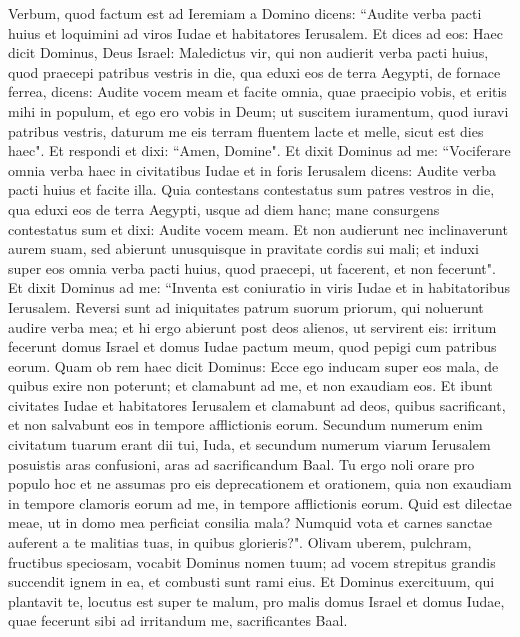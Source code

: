 \begin{biblechapter}  
\verse Verbum, quod factum est ad Ieremiam a Domino dicens: 
\verse “Audite verba pacti huius et loquimini ad viros Iudae et habitatores Ierusalem. 
\verse Et dices ad eos: Haec dicit Dominus, Deus Israel: Maledictus vir, qui non audierit verba pacti huius, 
\verse quod praecepi patribus vestris in die, qua eduxi eos de terra Aegypti, de fornace ferrea, dicens: Audite vocem meam et facite omnia, quae praecipio vobis, et eritis mihi in populum, et ego ero vobis in Deum; 
\verse ut suscitem iuramentum, quod iuravi patribus vestris, daturum me eis terram fluentem lacte et melle, sicut est dies haec". Et respondi et dixi: “Amen, Domine". 
\verse Et dixit Dominus ad me: “Vociferare omnia verba haec in civitatibus Iudae et in foris Ierusalem dicens: Audite verba pacti huius et facite illa. 
\verse Quia contestans contestatus sum patres vestros in die, qua eduxi eos de terra Aegypti, usque ad diem hanc; mane consurgens contestatus sum et dixi: Audite vocem meam. 
\verse Et non audierunt nec inclinaverunt aurem suam, sed abierunt unusquisque in pravitate cordis sui mali; et induxi super eos omnia verba pacti huius, quod praecepi, ut facerent, et non fecerunt". 
\verse Et dixit Dominus ad me: “Inventa est coniuratio in viris Iudae et in habitatoribus Ierusalem. 
\verse Reversi sunt ad iniquitates patrum suorum priorum, qui noluerunt audire verba mea; et hi ergo abierunt post deos alienos, ut servirent eis: irritum fecerunt domus Israel et domus Iudae pactum meum, quod pepigi cum patribus eorum. 
\verse Quam ob rem haec dicit Dominus: Ecce ego inducam super eos mala, de quibus exire non poterunt; et clamabunt ad me, et non exaudiam eos. 
\verse Et ibunt civitates Iudae et habitatores Ierusalem et clamabunt ad deos, quibus sacrificant, et non salvabunt eos in tempore afflictionis eorum. 
\verse Secundum numerum enim civitatum tuarum erant dii tui, Iuda, et secundum numerum viarum Ierusalem posuistis aras confusioni, aras ad sacrificandum Baal. 
\verse Tu ergo noli orare pro populo hoc et ne assumas pro eis deprecationem et orationem, quia non exaudiam in tempore clamoris eorum ad me, in tempore afflictionis eorum. 
\verse Quid est dilectae meae, ut in domo mea perficiat consilia mala? Numquid vota et carnes sanctae auferent a te malitias tuas, in quibus glorieris?". 
\verse Olivam uberem, pulchram, fructibus speciosam, vocabit Dominus nomen tuum; ad vocem strepitus grandis succendit ignem in ea, et combusti sunt rami eius. 
\verse Et Dominus exercituum, qui plantavit te, locutus est super te malum, pro malis domus Israel et domus Iudae, quae fecerunt sibi ad irritandum me, sacrificantes Baal. 

\end{biblechapter}
